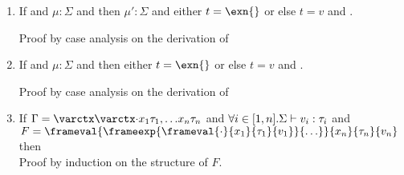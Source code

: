 \begin{enumerate}

\item \label{binoppres} If  and $\mu : \Sigma$ and  then $\mu' : \Sigma$ and either $t = \exn{}$ or else $t = v$ and .

  Proof by case analysis on the derivation of 

\item \label{monoppres} If  and $\mu : \Sigma$ and  then either $t = \exn{}$ or else $t = v$ and .

  Proof by case analysis on the derivation of 

\item \label{constructctx} If $\Gamma = \expandedG$ and $\forall i \in [1,n]. \Sigma \vdash v_i : \tau_i$ and $F = \frameval{\frameexp{\frameval{\cdot}{x_1}{\tau_1}{v_1}}{\ldots}}{x_n}{\tau_n}{v_n}$ then  \\

  Proof by induction on the structure of $F$.


\end{enumerate}
